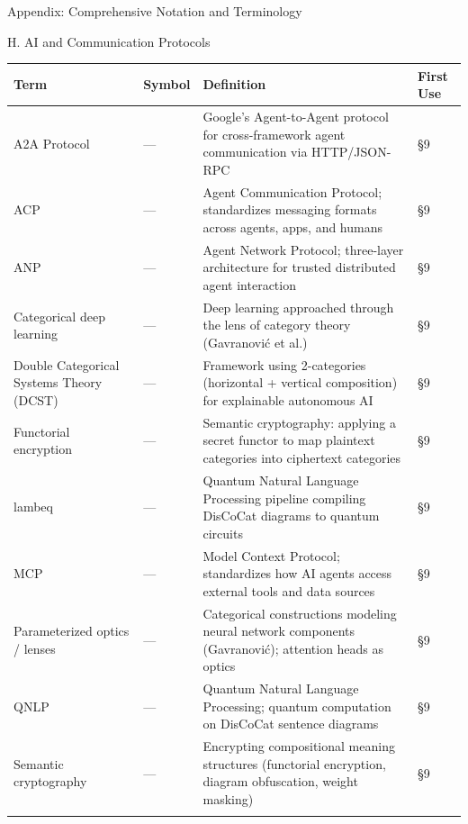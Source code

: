 \documentclass[
  ignorenonframetext,
]{beamer}
\newcounter{none} %
\begin{document}
\begin{frame}[fragile]{Appendix: Comprehensive Notation and Terminology}
\begin{block}{H. AI and Communication Protocols}
\protect{}\label{h.-ai-and-communication-protocols}
{\def\LTcaptype{none} %
\begin{longtable}[]{@{}
  >{\raggedright\arraybackslash}p{}
  >{\centering\arraybackslash}p{}
  >{\raggedright\arraybackslash}p{}
  >{\centering\arraybackslash}p{}@{}}
\toprule\noalign{}
\begin{minipage}[b]{\linewidth}\raggedright
Term
\end{minipage} & \begin{minipage}[b]{\linewidth}\centering
Symbol
\end{minipage} & \begin{minipage}[b]{\linewidth}\raggedright
Definition
\end{minipage} & \begin{minipage}[b]{\linewidth}\centering
First Use
\end{minipage} \\
\midrule\noalign{}
\endhead
A2A Protocol & --- & Google's Agent-to-Agent protocol for
cross-framework agent communication via HTTP/JSON-RPC & §9 \\
ACP & --- & Agent Communication Protocol; standardizes messaging formats
across agents, apps, and humans & §9 \\
ANP & --- & Agent Network Protocol; three-layer architecture for trusted
distributed agent interaction & §9 \\
Categorical deep learning & --- & Deep learning approached through the
lens of category theory (Gavranović et al.) & §9 \\
Double Categorical Systems Theory (DCST) & --- & Framework using
2-categories (horizontal + vertical composition) for explainable
autonomous AI & §9 \\
Functorial encryption & --- & Semantic cryptography: applying a secret
functor to map plaintext categories into ciphertext categories & §9 \\
lambeq & --- & Quantum Natural Language Processing pipeline compiling
DisCoCat diagrams to quantum circuits & §9 \\
MCP & --- & Model Context Protocol; standardizes how AI agents access
external tools and data sources & §9 \\
Parameterized optics / lenses & --- & Categorical constructions modeling
neural network components (Gavranović); attention heads as optics &
§9 \\
QNLP & --- & Quantum Natural Language Processing; quantum computation on
DisCoCat sentence diagrams & §9 \\
Semantic cryptography & --- & Encrypting compositional meaning
structures (functorial encryption, diagram obfuscation, weight masking)
& §9 \\
\bottomrule\noalign{}
\end{longtable}
}
\end{block}


\end{frame}
\end{document}
